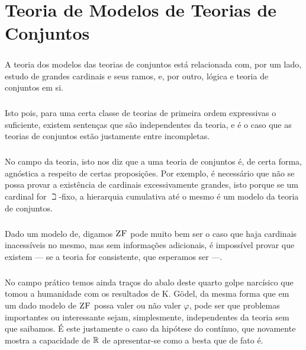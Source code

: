 \chapter{Teoria de Modelos de Teorias de Conjuntos}
    \cls
    \paragraph{}
        A teoria dos modelos das teorias de conjuntos está relacionada 
        com, por um lado, estudo de grandes cardinais e seus ramos, e,
        por outro, lógica e teoria de conjuntos em si.
    \paragraph{}
        Isto pois, para uma certa classe de teorias de primeira ordem 
        expressivas o suficiente, existem sentenças que são independentes
        da teoria, e é o caso que as teorias de conjuntos estão justamente 
        entre incompletas.
    \paragraph{}
        No campo da teoria, isto nos diz que a uma teoria de conjuntos é,
        de certa forma, agnóstica a respeito de certas proposições. Por 
        exemplo, é necessário que não se possa provar a existência de 
        cardinais excessivamente grandes, isto porque se um cardinal for 
        $\beth$-fixo, a hierarquia cumulativa até o mesmo é um modelo 
        da teoria de conjuntos.
    \paragraph{}
        Dado um modelo de, digamos $\text{\sc ZF}$ pode muito bem ser o caso que 
        haja cardinais inacessíveis no mesmo, mas sem informações 
        adicionais, é impossível provar que existem --- se a teoria for
        consistente, que esperamos ser ---.
    \paragraph{}
        No campo prático temos ainda traços do abalo deste quarto golpe
        narcísico que tomou a humanidade com os resultados de K. Gödel,
        da mesma forma que em um dado modelo de $\text{\sc ZF}$ possa valer ou 
        não valer $\varphi$, pode ser que problemas importantes ou 
        interessante sejam, simplesmente, independentes da teoria sem que 
        saibamos. É este justamente o caso da hipótese do contínuo, que 
        novamente mostra a capacidade de $\mathbb{R}$ de apresentar-se como a besta
        que de fato é.
